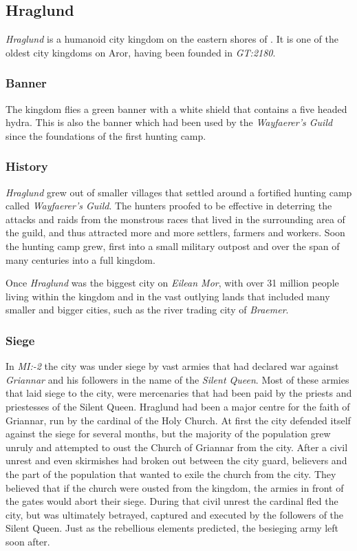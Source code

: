 \subsection{Hraglund}
\label{sec:Hraglund}

\emph{Hraglund} is a humanoid city kingdom on the eastern shores of
. It is one of the oldest city kingdoms on Aror,
having been founded in \emph{GT:2180}.

\subsubsection*{Banner}

The kingdom flies a green banner with a white shield that contains a five
headed hydra. This is also the banner which had been used by the
\emph{Wayfaerer's Guild} since the foundations of the first hunting camp.

\subsubsection*{History}

\emph{Hraglund} grew out of smaller villages that settled around a fortified
hunting camp called \emph{Wayfaerer's Guild}. The hunters proofed to be
effective in deterring the attacks and raids from the monstrous races that
lived in the surrounding area of the guild, and thus attracted more and more
settlers, farmers and workers. Soon the hunting camp grew, first into a small
military outpost and over the span of many centuries into a full kingdom.

Once \emph{Hraglund} was the biggest city on \emph{Eilean Mor}, with over
31 million people living within the kingdom and in the vast outlying lands
that included many smaller and bigger cities, such as the river trading city
of \emph{Braemer}.

\subsubsection*{Siege}

In \emph{MI:-2} the city was under siege by vast armies that had declared war
against \emph{Griannar} and his followers in the name of the
\emph{Silent Queen}. Most of these armies that laid siege to the city, were
mercenaries that had been paid by the priests and priestesses of the Silent
Queen. Hraglund had been a major centre for the faith of Griannar, run by the
cardinal of the Holy Church. At first the city defended itself against the
siege for several months, but the majority of the population grew unruly and
attempted to oust the Church of Griannar from the city. After a civil unrest
and even skirmishes had broken out between the city guard, believers and the
part of the population that wanted to exile the church from the city. They
believed that if the church were ousted from the kingdom, the armies in front
of the gates would abort their siege. During that civil unrest the cardinal
fled the city, but was ultimately betrayed, captured and executed by the
followers of the Silent Queen. Just as the rebellious elements predicted, the
besieging army left soon after.

